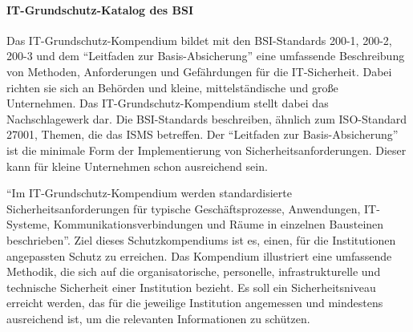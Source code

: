 \paragraph{IT-Grundschutz-Katalog des \ac{BSI}}
Das IT-Grundschutz-Kompendium bildet mit den BSI-Standards 200-1, 200-2, 200-3 und dem \enquote{Leitfaden zur Basis-Absicherung} eine umfassende Beschreibung von Methoden, Anforderungen und Gefährdungen für die IT-Sicherheit. Dabei richten sie sich an Behörden und kleine, mittelständische und große Unternehmen.\autocite[vgl.][S.\,3]{bundesamt_fur_sicherheit_in_der_informationstechnik_bsi_it-grundschutz-kompendium_2020} Das IT-Grundschutz-Kompendium stellt dabei das Nachschlagewerk dar. Die BSI-Standards beschreiben, ähnlich zum ISO-Standard 27001, Themen, die das \ac{ISMS} betreffen. Der \enquote{Leitfaden zur Basis-Absicherung} ist die minimale Form der Implementierung von Sicherheitsanforderungen. Dieser kann für kleine Unternehmen schon ausreichend sein.\autocite[vgl.][S.\,5]{bundesamt_fur_sicherheit_in_der_informationstechnik_bsi_leitfaden_2017}
\par
\enquote{Im IT-Grundschutz-Kompendium werden standardisierte Sicherheitsanforderungen für typische Geschäftsprozesse, Anwendungen, IT-Systeme, Kommunikationsverbindungen und Räume in einzelnen Bausteinen beschrieben}.\autocite[][S.\,2]{bundesamt_fur_sicherheit_in_der_informationstechnik_bsi_it-grundschutz-kompendium_2020} Ziel dieses Schutzkompendiums ist es, einen, für die Institutionen angepassten Schutz zu erreichen. Das Kompendium illustriert eine umfassende Methodik, die sich auf die organisatorische, personelle, infrastrukturelle und technische Sicherheit einer Institution bezieht. Es soll ein Sicherheitsniveau erreicht werden, das für die jeweilige Institution angemessen und mindestens ausreichend ist, um die relevanten Informationen zu schützen. 

